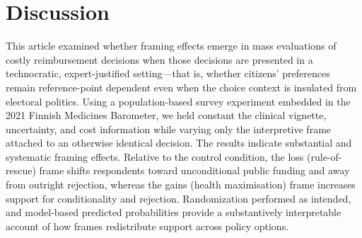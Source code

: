 \documentclass[11pt]{article}\usepackage[]{graphicx}\usepackage[]{xcolor}
\begin{document}
\section{Discussion}\label{discussion}

This article examined whether framing effects emerge in mass evaluations of costly reimbursement decisions when those decisions are presented in a technocratic, expert-justified setting---that is, whether citizens' preferences remain reference-point dependent even when the choice context is insulated from electoral politics. Using a population-based survey experiment embedded in the 2021 Finnish Medicines Barometer, we held constant the clinical vignette, uncertainty, and cost information while varying only the interpretive frame attached to an otherwise identical decision. The results indicate substantial and systematic framing effects. Relative to the control condition, the loss (rule-of-rescue) frame shifts respondents toward unconditional public funding and away from outright rejection, whereas the gains (health maximisation) frame increases support for conditionality and rejection. Randomization performed as intended, and model-based predicted probabilities provide a substantively interpretable account of how frames redistribute support across policy options.
\end{document}
